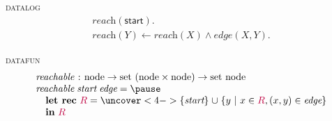 \documentclass[aspectratio=169,dvipsnames,draft]{beamer}
\newcommand\x\times
\newcommand\isa{\hspace{.1em}:\hspace{.1em}}
\newcommand{\setfor}[2]{\{{#1} \mathrel{|} {#2}\}}
\newcommand\kw\textbf
\newcommand\n\textit
\newcommand\tpname\text
\renewcommand\c\textsf
\newcommand\tset{\tpname{set}~}
\newcommand\tnode{\tpname{node}}
\newcommand\mvar[1]{{\color{purple} #1}}
\newcommand\eset[1]{\{{#1}\}}
\newcommand\esetfor[2]{\eset{{#1} ~|~ {#2}}}
\newcommand\eletfix[2]{\kw{let rec}~ \mvar{#1} = {#2}}
\let\oldcup\cup
\renewcommand\cup{\mathrel{\oldcup}}
\begin{document}

  \begin{frame}
    \centering
    \begin{fleqn}
      \textsc{datalog}
      \[\begin{array}{l}
      \n{reach}(\c{start}).\\
      \n{reach}(Y) \gets \n{reach}(X) \wedge \n{edge}(X,Y).
      \end{array}
      \]
      \vspace{0pt}\pause

      \textsc{datafun}
      \[
      \begin{array}{l}
      \n{reachable} \isa \tnode \to \tset (\tnode \x \tnode) \to \tset \tnode\\
      \n{reachable} \;\n{start} \;\n{edge} = \pause
      \\\quad
      \eletfix{R}{\uncover<4->{\eset{\n{start}} \cup
        \esetfor{y}{x \in \mvar R, (x,y) \in \n{edge}}}}
      \\\quad
      \kw{in}~\mvar R
      \end{array}\]
    \end{fleqn}
  \end{frame}


  \newcommand\setcolor[1]{{\alt<3->{\color{ForestGreen}}{}#1}}
  \newcommand\compcolor[1]{{\alt<3->{\color{RoyalBlue}}{}#1}}
  \newcommand\fixptcolor[1]{{\alt<4->{\color{Red}}{}#1}}
\end{document}
